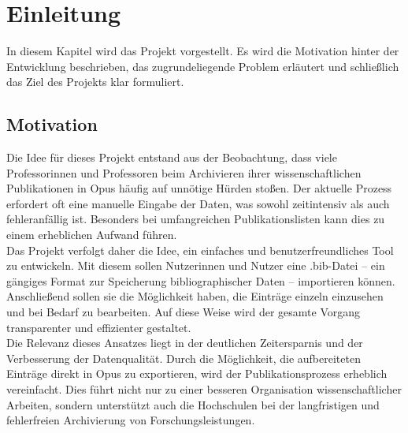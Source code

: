 \chapter{Einleitung}
In diesem Kapitel wird das Projekt vorgestellt. Es wird die Motivation 
hinter der Entwicklung beschrieben, das zugrundeliegende Problem erläutert
und schließlich das Ziel des Projekts klar formuliert. 

\section{Motivation}
Die Idee für dieses Projekt entstand aus der Beobachtung, dass viele 
Professorinnen und Professoren beim Archivieren ihrer wissenschaftlichen 
Publikationen in Opus häufig auf unnötige Hürden stoßen. Der aktuelle Prozess 
erfordert oft eine manuelle Eingabe der Daten, was sowohl zeitintensiv 
als auch fehleranfällig ist. Besonders bei umfangreichen Publikationslisten 
kann dies zu einem erheblichen Aufwand führen.\\

\noindent Das Projekt verfolgt daher die Idee, ein einfaches und 
benutzerfreundliches Tool zu entwickeln. Mit diesem sollen Nutzerinnen und 
Nutzer eine .bib-Datei – ein gängiges Format zur Speicherung 
bibliographischer Daten – importieren können. Anschließend sollen sie die 
Möglichkeit haben, die Einträge einzeln einzusehen und bei Bedarf zu 
bearbeiten. Auf diese Weise wird der gesamte Vorgang transparenter und 
effizienter gestaltet.\\

\noindent Die Relevanz dieses Ansatzes liegt in der deutlichen Zeitersparnis und der 
Verbesserung der Datenqualität. Durch die Möglichkeit, die aufbereiteten 
Einträge direkt in Opus zu exportieren, wird der Publikationsprozess 
erheblich vereinfacht. Dies führt nicht nur zu einer besseren Organisation 
wissenschaftlicher Arbeiten, sondern unterstützt auch die Hochschulen bei 
der langfristigen und fehlerfreien Archivierung von Forschungsleistungen.

